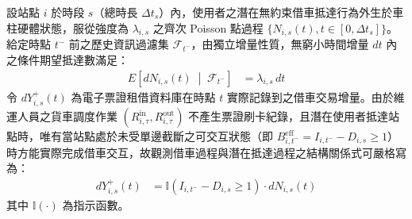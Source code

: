 設站點 $i$ 於時段 $s$（總時長 $\Delta t_s$）內，使用者之潛在無約束借車抵達行為外生於車柱硬體狀態，服從強度為 $\lambda_{i,s}$ 之齊次 Poisson 點過程 $\{N_{i,s}(t), t \in [0, \Delta t_s]\}$。給定時點 $t^-$ 前之歷史資訊過濾集 $\mathcal{F}_{t^-}$，由獨立增量性質，無窮小時間增量 $dt$ 內之條件期望抵達數滿足：
\begin{align}
E\left[dN_{i,s}(t) \;\middle|\; \mathcal{F}_{t^-}\right] &= \lambda_{i,s} \, dt
\end{align}
令 $dY^+_{i,s}(t)$ 為電子票證租借資料庫在時點 $t$ 實際記錄到之借車交易增量。由於維運人員之貨車調度作業 $(R^{\text{in}}_{i,\tau}, R^{\text{out}}_{i,\tau})$ 不產生票證刷卡紀錄，且潛在使用者抵達站點時，唯有當站點處於未受單邊截斷之可交互狀態（即 $B^{\text{eff}}_{i,t^-} = I_{i,t^-} - D_{i,s} \ge 1$）時方能實際完成借車交互，故觀測借車過程與潛在抵達過程之結構關係式可嚴格寫為：
\begin{align}
dY^+_{i,s}(t) &= \mathbb{I}\left(I_{i,t^-} - D_{i,s} \ge 1\right) \cdot dN_{i,s}(t) \label{eq:censored_poisson_increment}
\end{align}
其中 $\mathbb{I}(\cdot)$ 為指示函數。


